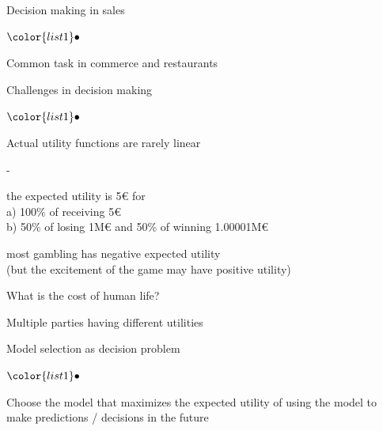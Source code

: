 \documentclass[t]{beamer}
\newenvironment{list1}{
   \begin{list}{$\color{list1}\bullet$}{\itemsep=6pt}}{
  \end{list}}
\newenvironment{list2}{
  \begin{list}{-}{\baselineskip=12pt\itemsep=2pt}}{
  \end{list}}
\begin{document}
\begin{frame}{Decision making in sales}

  \begin{list1}
    \item Common task in commerce and restaurants
  \end{list1}
  
\end{frame}  


\begin{frame}{Challenges in decision making}

  \begin{list1}
  \item Actual utility functions are rarely linear
    \begin{list2}
    \item<2-> the expected utility is 5€ for\\
      a) 100\% of receiving 5€\\
      b) 50\% of losing 1M€ and 50\% of winning 1.00001M€
    \item<3-> most gambling has negative expected utility\\
      (but the excitement of the game may have positive utility)
    \end{list2}
  \item<4-> What is the cost of human life?
  \item<5-> Multiple parties having different utilities
  \end{list1}
  
\end{frame}

\begin{frame}{Model selection as decision problem}

  \begin{list1}
  \item Choose the model that maximizes the expected utility of using
    the model to make predictions / decisions in the future
  \end{list1}

\end{frame}
\end{document}

